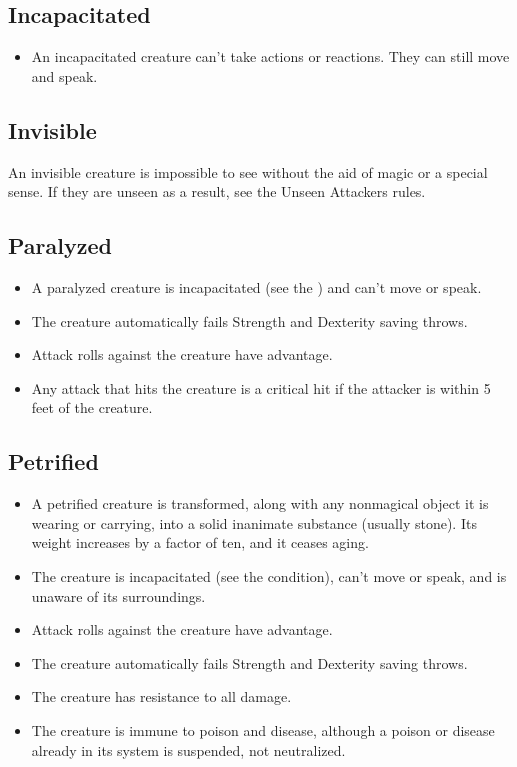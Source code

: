\subsection{Incapacitated\label{condition:incapacitated}}
\begin{itemize}
\item An incapacitated creature can't take actions or reactions. They can still move and speak.
\end{itemize}

\subsection{Invisible\label{condition:invisible}}
An invisible creature is impossible to see without the aid of magic or a special sense. If they are unseen as a result, see the Unseen Attackers rules. 

\subsection{Paralyzed\label{condition:paralyzed}}
\begin{itemize}
\item A paralyzed creature is incapacitated (see the ) and can't move or speak.
\item The creature automatically fails Strength and Dexterity saving throws.
\item Attack rolls against the creature have advantage.
\item Any attack that hits the creature is a critical hit if the attacker is within 5 feet of the creature.
\end{itemize}

\subsection{Petrified\label{condition:petrified}}
\begin{itemize}
\item A petrified creature is transformed, along with any nonmagical object it is wearing or carrying, into a solid inanimate substance (usually stone). Its weight increases by a factor of ten, and it ceases aging.
\item The creature is incapacitated (see the condition), can't move or speak, and is unaware of its surroundings.
\item Attack rolls against the creature have advantage.
\item The creature automatically fails Strength and Dexterity saving throws.
\item The creature has resistance to all damage.
\item The creature is immune to poison and disease, although a poison or disease already in its system is suspended, not neutralized.
\end{itemize}


